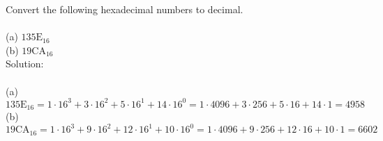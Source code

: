 Convert the following hexadecimal numbers to decimal. \\
\\
(a) $135\textrm{E}_{16}$ \\
(b) $19\textrm{CA}_{16}$ \\

Solution: \\
\\
(a) $135\textrm{E}_{16} = 1 \cdot 16^3 + 3 \cdot 16^2 + 5 \cdot 16^1 + 14 \cdot 16^0 = 1 \cdot 4096 + 3 \cdot 256 + 5 \cdot 16 + 14 \cdot 1 = 4958$ \\
(b) $19\textrm{CA}_{16} = 1 \cdot 16^3 + 9 \cdot 16^2 + 12 \cdot 16^1 + 10 \cdot 16^0 = 1 \cdot 4096 + 9 \cdot 256 + 12 \cdot 16 + 10 \cdot 1 = 6602$ \\
\\
